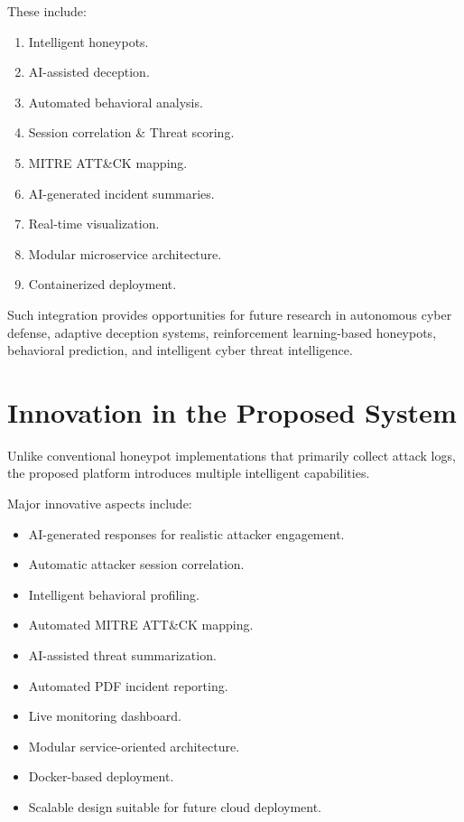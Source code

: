 \documentclass[12pt,a4paper]{report}
\begin{document}
These include:

\begin{enumerate}
\item Intelligent honeypots.
\item AI-assisted deception.
\item Automated behavioral analysis.
\item Session correlation \& Threat scoring.
\item MITRE ATT\&CK mapping.
\item AI-generated incident summaries.
\item Real-time visualization.
\item Modular microservice architecture.
\item Containerized deployment.
\end{enumerate}

Such integration provides opportunities for future research in autonomous cyber defense, adaptive deception systems, reinforcement learning-based honeypots, behavioral prediction, and intelligent cyber threat intelligence.


\section{Innovation in the Proposed System}

Unlike conventional honeypot implementations that primarily collect attack logs, the proposed platform introduces multiple intelligent capabilities.

Major innovative aspects include:

\begin{itemize}
\item AI-generated responses for realistic attacker engagement.
\item Automatic attacker session correlation.
\item Intelligent behavioral profiling.
\item Automated MITRE ATT\&CK mapping.
\item AI-assisted threat summarization.
\item Automated PDF incident reporting.
\item Live monitoring dashboard.
\item Modular service-oriented architecture.
\item Docker-based deployment.
\item Scalable design suitable for future cloud deployment.
\end{itemize}
\end{document}
